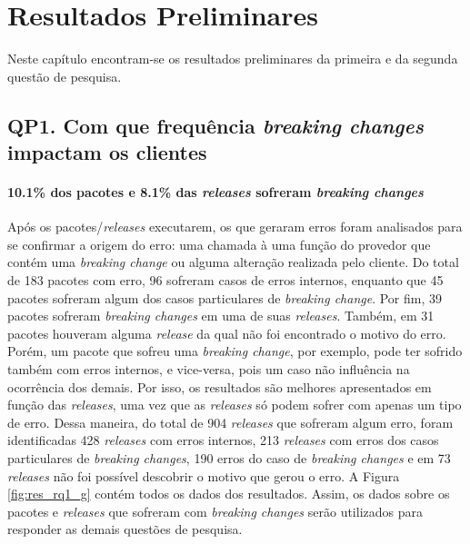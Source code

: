 \chapter{Resultados Preliminares}
\label{cap:res_pre}

Neste capítulo encontram-se os resultados preliminares da primeira e da segunda questão de pesquisa.

\section{QP1. Com que frequência \textit{breaking changes} impactam os clientes}
\label{res:qp1}

\subsubsection{\textbf{10.1\% dos pacotes e 8.1\% das \textit{releases} sofreram \textit{breaking changes}}}

Após os pacotes/\textit{releases} executarem, os que geraram erros foram analisados para se confirmar a origem do erro: uma chamada à uma função do provedor que contém uma \textit{breaking change} ou alguma alteração realizada pelo cliente. Do total de 183 pacotes com erro, 96 sofreram casos de erros internos, enquanto que 45 pacotes sofreram algum dos casos particulares de \textit{breaking change}. Por fim, 39 pacotes sofreram \textit{breaking changes} em uma de suas \textit{releases}. Também, em 31 pacotes houveram alguma \textit{release} da qual não foi encontrado o motivo do erro. Porém, um pacote que sofreu uma \textit{breaking change}, por exemplo, pode ter sofrido também com erros internos, e vice-versa, pois um caso não influência na ocorrência dos demais. Por isso, os resultados são melhores apresentados em função das \textit{releases}, uma vez que as \textit{releases} só podem sofrer com apenas um tipo de erro. Dessa maneira, do total de 904 \textit{releases} que sofreram algum erro, foram identificadas 428 \textit{releases} com erros internos, 213 \textit{releases} com erros dos casos particulares de \textit{breaking changes}, 190 erros do caso de \textit{breaking changes} e em 73 \textit{releases} não foi possível descobrir o motivo que gerou o erro. A Figura \ref{fig:res_rq1_g} contém todos os dados dos resultados. Assim, os dados sobre os pacotes e \textit{releases} que sofreram com \textit{breaking changes} serão utilizados para responder as demais questões de pesquisa.

